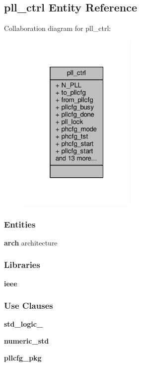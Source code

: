 \subsection{pll\+\_\+ctrl Entity Reference}
\label{classpll__ctrl}


Collaboration diagram for pll\+\_\+ctrl\+:\nopagebreak
\begin{figure}[H]
\begin{center}
\leavevmode
\includegraphics[width=160pt]{d8/de1/classpll__ctrl__coll__graph}
\end{center}
\end{figure}
\subsubsection*{Entities}
\begin{DoxyCompactItemize}
\item 
{\bf arch} architecture
\end{DoxyCompactItemize}
\subsubsection*{Libraries}
 \begin{DoxyCompactItemize}
\item 
{\bf ieee} 
\end{DoxyCompactItemize}
\subsubsection*{Use Clauses}
 \begin{DoxyCompactItemize}
\item 
{\bf std\+\_\+logic\+\_}   
\item 
{\bf numeric\+\_\+std}   
\item 
{\bf pllcfg\+\_\+pkg}   
\end{DoxyCompactItemize}
